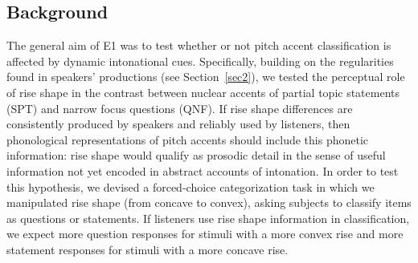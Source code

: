\subsection{Background}\label{sec3200}
The general aim of E1 was to test whether or not pitch accent classification is affected by dynamic intonational cues. Specifically, building on the regularities found in speakers' productions (see Section~\ref{sec2}), we tested the perceptual role of rise shape in the contrast between nuclear accents of partial topic statements (SPT) and narrow focus questions (QNF). If rise shape differences are consistently produced by speakers and reliably used by listeners, then phonological representations of pitch accents should include this phonetic information: rise shape would qualify as prosodic detail in the sense of useful information not yet encoded in abstract accounts of intonation. In order to test this hypothesis, we devised a forced-choice categorization task in which we manipulated rise shape (from concave to convex), asking subjects to classify items as questions or statements. If listeners use rise shape information in classification, we expect more question responses for stimuli with a more convex rise and more statement responses for stimuli with a more concave rise.

